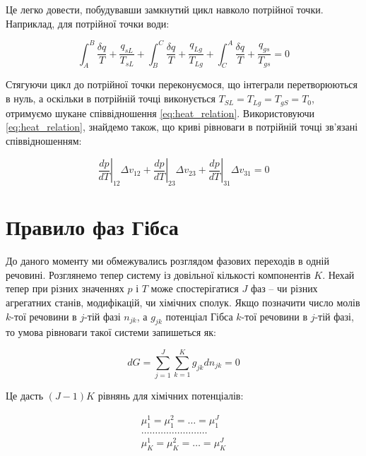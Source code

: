 Це легко довести, побудувавши замкнутий цикл навколо потрійної точки. Наприклад, для потрійної точки
води:

\begin{equation}
\int_{A}^{B}\frac{\delta q}{T} + \frac{q_{sL}}{T_{sL}} + \int_{B}^{C}\frac{\delta q}{T} +
\frac{q_{Lg}}{T_{Lg}} + \int_{C}^{A}\frac{\delta q}{T} + \frac{q_{gs}}{T_{gs}} = 0
\end{equation}

Стягуючи цикл до потрійної точки переконуємося, що інтеграли перетворюються в нуль, а оскільки в
потрійній точці виконується $T_{SL} = T_{Lg} = T_{gS} = T_0$, отримуємо шукане співвідношення
\eqref{eq:heat_relation}. Використовуючи \eqref{eq:heat_relation}, знайдемо також, що криві рівноваги
в потрійній точці зв'язані співвідношенням:

\begin{equation}\label{eq:slope_relation}
\left.\frac{dp}{dT}\right|_{12}\Delta v_{12} + \left.\frac{dp}{dT}\right|_{23}\Delta v_{23} +
\left.\frac{dp}{dT}\right|_{31}\Delta v_{31} = 0
\end{equation}

\section{Правило фаз Гібса}

До даного моменту ми обмежувались розглядом фазових переходів в одній речовині.
Розглянемо тепер систему із довільної кількості компонентів $K$. Нехай тепер при різних значеннях $p$
і $T$ може спостерігатися $J$ фаз -- чи різних агрегатних станів, модифікацій, чи хімічних сполук.
Якщо позначити число молів $k$-тої речовини в $j$-тій фазі $n_{jk}$, а $g_{jk}$ потенціал Гібса
$k$-тої речовини в $j$-тій фазі, то умова рівноваги такої системи запишеться як:

\begin{equation}\label{eq:total_equilibrium}
dG = \sum_{j=1}^{J}\sum_{k=1}^{K} g_{jk} dn_{jk} = 0
\end{equation}

Це дасть $(J-1)K$ рівнянь для хімічних потенціалів:

\begin{equation}\label{eq:chemical_potentials}
\begin{matrix}
\mu_1^1 = \mu_1^2 = \ldots = \mu_1^J \\
\ldots\ldots\ldots\ldots\ldots\ldots\ldots\ldots \\
\mu_K^1 = \mu_K^2 = \ldots = \mu_K^J
\end{matrix}
\end{equation}

